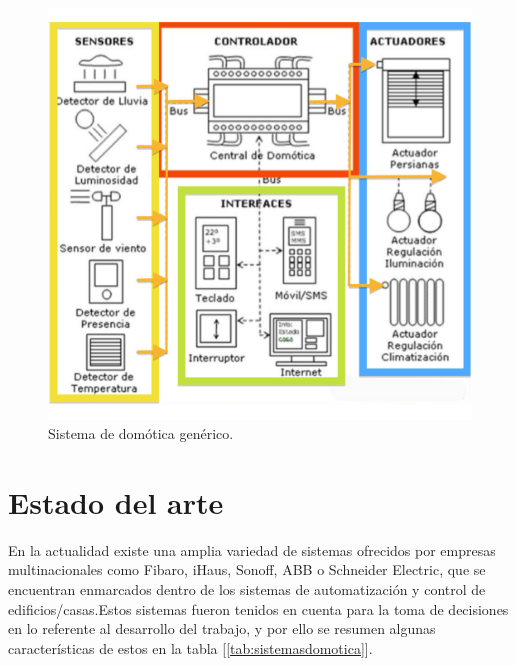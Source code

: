\begin{figure}[h]
	\centering
	\includegraphics[width=.55\textwidth]{./Figures/domoticagenerico.png}
	\caption{Sistema de domótica genérico.}
	\label{fig:domoticagenerico}
\end{figure}




\section{Estado del arte}

En la actualidad existe una amplia variedad de sistemas ofrecidos por empresas multinacionales como Fibaro, iHaus, Sonoff, ABB o Schneider Electric, que se encuentran enmarcados dentro de los sistemas de automatización y control de edificios/casas.Estos sistemas fueron tenidos en cuenta para la toma de decisiones en lo referente al desarrollo del trabajo, y por ello se resumen algunas características de estos en la tabla [\ref{tab:sistemasdomotica}].

